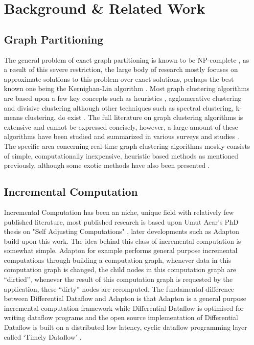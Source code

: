 \chapter{Background \& Related Work}

\section{Graph Partitioning}
The general problem of exact graph partitioning is known to be NP-complete \cite{garey1974some}, as a result of this severe restriction, the large body of research mostly focuses on approximate solutions to this problem over exact solutions, perhaps the best known one being the Kernighan-Lin algorithm \cite{kernighan1970efficient}. Most graph clustering algorithms are based upon a few key concepts such as heuristics \cite{kernighan1970efficient}, agglomerative clustering \cite{newman2004fastcommunity, clauset2004finding} and divisive clustering \cite{newman2004findingeval} although other techniques such as spectral clustering, k-means clustering, do exist \cite{hopcroft2003naturalcommunity, alzate2008multiway, lang2004flow}. The full literature on graph clustering algorithms is extensive and cannot be expressed concisely, however, a large amount of these algorithms have been studied and summarized in various surveys and studies \cite{schaeffer2007graph, abbas2018streaming, leskovec2010empirical}. The specific area concerning real-time graph clustering algorithms mostly consists of simple, computationally inexpensive, heuristic based methods \cite{stanton2012streaming} as mentioned previously, although some exotic methods have also been presented \cite{zanghi2008fast}. 

\section{Incremental Computation}
Incremental Computation has been an niche, unique field with relatively few published literature, most published research is based upon Umut Acar's PhD thesis on "Self Adjusting Computations" \cite{acar2005self}, later developments such as Adapton \cite{hammer2014adapton} build upon this work. The idea behind this class of incremental computation is somewhat simple. Adapton for example performs general purpose incremental computations through building a computation graph, whenever data in this computation graph is changed, the child nodes in this computation graph are ``dirtied'', whenever the result of this computation graph is requested by the application, these ``dirty'' nodes are recomputed. The fundamental difference between Differential Dataflow and Adapton is that Adapton is a general purpose incremental computation framework while Differential Dataflow is optimised for writing dataflow programs and the open source implementation of Differential Dataflow is built on a distributed low latency, cyclic dataflow programming layer called `Timely Dataflow' \cite{murray2013naiad}. 


